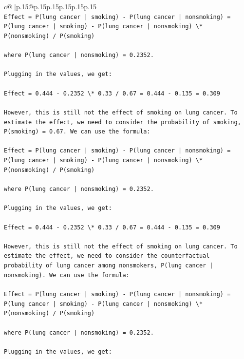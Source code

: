 \documentclass{article}
\begin{document}
{\begin{supertabular}{c@{$\;$}|p{.15\linewidth}@{}p{.15\linewidth}p{.15\linewidth}p{.15\linewidth}p{.15\linewidth}p{.15\linewidth}}
{{{\\ 
\texttt{Effect = P(lung cancer | smoking) {-} P(lung cancer | nonsmoking) = P(lung cancer | smoking) {-} P(lung cancer | nonsmoking) \textbackslash{}* P(nonsmoking) / P(smoking)} \\
\\ 
\texttt{where P(lung cancer | nonsmoking) = 0.2352.} \\
\\ 
\texttt{Plugging in the values, we get:} \\
\\ 
\texttt{Effect = 0.444 {-} 0.2352 \textbackslash{}* 0.33 / 0.67 = 0.444 {-} 0.135 = 0.309} \\
\\ 
\texttt{However, this is still not the effect of smoking on lung cancer. To estimate the effect, we need to consider the probability of smoking, P(smoking) = 0.67. We can use the formula:} \\
\\ 
\texttt{Effect = P(lung cancer | smoking) {-} P(lung cancer | nonsmoking) = P(lung cancer | smoking) {-} P(lung cancer | nonsmoking) \textbackslash{}* P(nonsmoking) / P(smoking)} \\
\\ 
\texttt{where P(lung cancer | nonsmoking) = 0.2352.} \\
\\ 
\texttt{Plugging in the values, we get:} \\
\\ 
\texttt{Effect = 0.444 {-} 0.2352 \textbackslash{}* 0.33 / 0.67 = 0.444 {-} 0.135 = 0.309} \\
\\ 
\texttt{However, this is still not the effect of smoking on lung cancer. To estimate the effect, we need to consider the counterfactual probability of lung cancer among nonsmokers, P(lung cancer | nonsmoking). We can use the formula:} \\
\\ 
\texttt{Effect = P(lung cancer | smoking) {-} P(lung cancer | nonsmoking) = P(lung cancer | smoking) {-} P(lung cancer | nonsmoking) \textbackslash{}* P(nonsmoking) / P(smoking)} \\
\\ 
\texttt{where P(lung cancer | nonsmoking) = 0.2352.} \\
\\ 
\texttt{Plugging in the values, we get:} \\
\\ 
}}}
\end{supertabular}}
\end{document}
